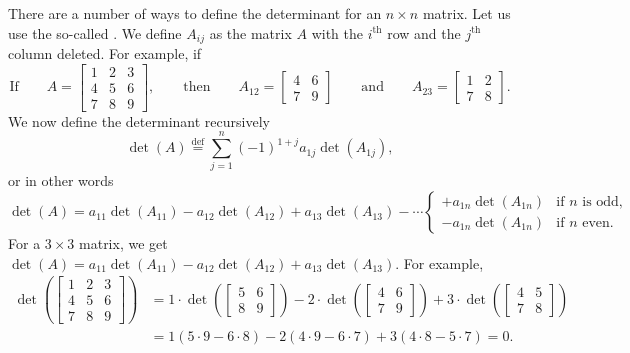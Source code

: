 There are a number of ways to define the determinant for an $n \times n$
matrix.  Let us use the so-called \emph{}.
We define $A_{ij}$ as
the matrix $A$ with the $i^{\text{th}}$ row and the $j^{\text{th}}$ column
deleted.  For example, if
\begin{equation*}
\text{If} \qquad
A = 
\begin{bmatrix}
1 & 2 & 3 \\
4 & 5 & 6 \\
7 & 8 & 9
\end{bmatrix} ,
\qquad
\text{then}
\qquad
A_{12} = 
\begin{bmatrix}
4 & 6 \\
7 & 9
\end{bmatrix}
\qquad
\text{and}
\qquad
A_{23} = 
\begin{bmatrix}
1 & 2 \\
7 & 8
\end{bmatrix} .
\end{equation*}
We now define the determinant recursively
\begin{equation*}
\det (A)
\overset{\text{def}}{=}
\sum_{j=1}^n
{(-1)}^{1+j}
a_{1j} \det (A_{1j}) ,
\end{equation*}
or in other words
\begin{equation*}
\det (A) =
a_{11} \det (A_{11}) - 
a_{12} \det (A_{12}) + 
a_{13} \det (A_{13}) - 
\cdots
\begin{cases}
+ a_{1n} \det (A_{1n}) & \text{if } n \text{ is odd,} \\
- a_{1n} \det (A_{1n}) & \text{if } n \text{ even.}
\end{cases}
\end{equation*}
For a $3 \times 3$ matrix,
we get $\det (A) = a_{11} \det (A_{11}) -
a_{12} \det (A_{12}) + a_{13} \det (A_{13})$.  For example,
\begin{equation*}
\begin{split}
\det \left(
\begin{bmatrix}
1 & 2 & 3 \\
4 & 5 & 6 \\
7 & 8 & 9
\end{bmatrix}
\right)
& =
1 \cdot
\det \left(
\begin{bmatrix}
5 & 6 \\
8 & 9
\end{bmatrix}
\right)
-
2 \cdot
\det \left(
\begin{bmatrix}
4 & 6 \\
7 & 9
\end{bmatrix}
\right)
+
3 \cdot
\det \left(
\begin{bmatrix}
4 & 5 \\
7 & 8
\end{bmatrix}
\right) \\
& =
1 (5 \cdot 9 - 6 \cdot 8)
-
2 (4 \cdot 9 - 6 \cdot 7)
+
3 (4 \cdot 8 - 5 \cdot 7)
= 0 .
\end{split}
\end{equation*}

